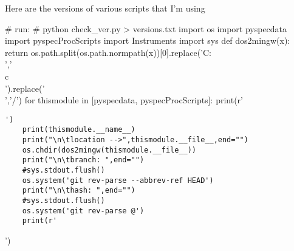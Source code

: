 \documentclass[10pt]{article}
\begin{document}
Here are the versions of various scripts that I'm using
\par
\begin{python}[on]
# run:
# python check_ver.py > versions.txt
import os
import pyspecdata
import pyspecProcScripts
import Instruments
import sys
def dos2mingw(x):
    return os.path.split(os.path.normpath(x))[0].replace('C:\\','\\c\\').replace('\\','/')
for thismodule in [pyspecdata, pyspecProcScripts]:
    print(r'\begin{verbatim}')
    print(thismodule.__name__)
    print("\n\tlocation -->",thismodule.__file__,end="")
    os.chdir(dos2mingw(thismodule.__file__))
    print("\n\tbranch: ",end="")
    #sys.stdout.flush()
    os.system('git rev-parse --abbrev-ref HEAD')
    print("\n\thash: ",end="")
    #sys.stdout.flush()
    os.system('git rev-parse @')
    print(r'\end{verbatim}')
\end{python}
\par





\end{document}

